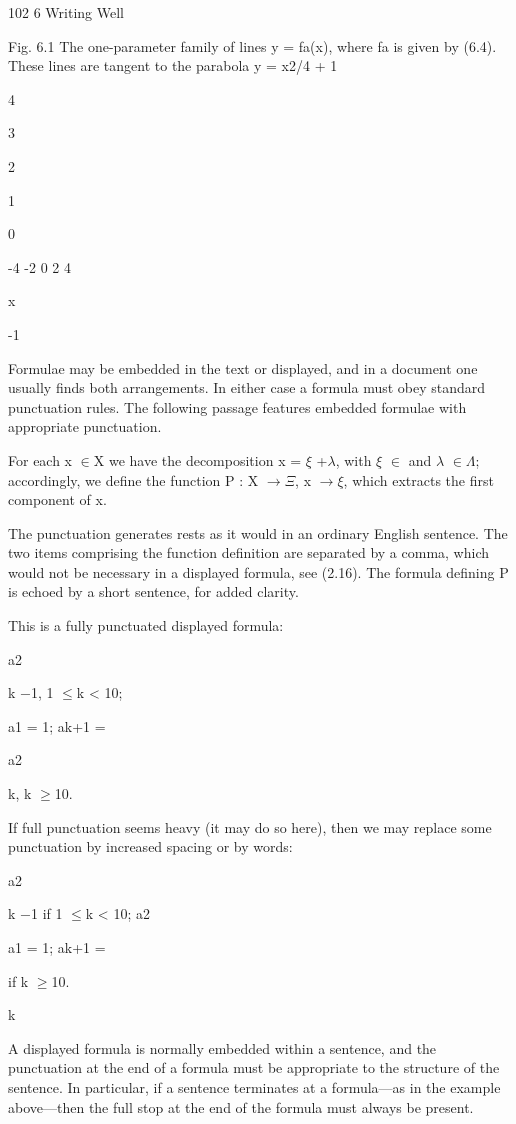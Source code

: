 \documentclass[11pt]{article}
\theoremstyle{plain}
\theoremstyle{definition}
\begin{document}
102 6 Writing Well

Fig. 6.1 The one-parameter family of lines y = fa(x), where fa is given by (6.4). These lines are tangent to the parabola y = x2/4 + 1

4

3

2

1

0

-4 -2 0 2 4

x

-1

Formulae may be embedded in the text or displayed, and in a document one usually finds both arrangements. In either case a formula must obey standard punctuation rules. The following passage features embedded formulae with appropriate punctuation.

For each x $\in$X we have the decomposition x = $\xi$ +$\lambda$, with $\xi$ $\in$ and $\lambda$ $\in$$\Lambda$; accordingly, we define the function P : X $\to$$\Xi$, x $\to$$\xi$, which extracts the first component of x.

The punctuation generates rests as it would in an ordinary English sentence. The two items comprising the function definition are separated by a comma, which would not be necessary in a displayed formula, see (2.16). The formula defining P is echoed by a short sentence, for added clarity.

This is a fully punctuated displayed formula:

a2

k $-$1, 1 $\leq$k < 10;

a1 = 1; ak+1 =

a2

k, k $\geq$10.

If full punctuation seems heavy (it may do so here), then we may replace some punctuation by increased spacing or by words:

a2

k $-$1 if 1 $\leq$k < 10; a2

a1 = 1; ak+1 =

if k $\geq$10.

k

A displayed formula is normally embedded within a sentence, and the punctuation at the end of a formula must be appropriate to the structure of the sentence. In particular, if a sentence terminates at a formula---as in the example above---then the full stop at the end of the formula must always be present.
\end{document}

